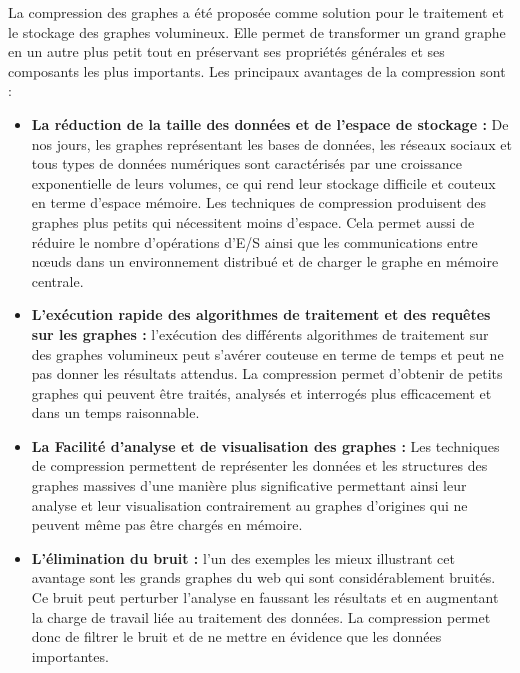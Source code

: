 La compression des graphes a été proposée comme solution pour le traitement et le stockage des graphes volumineux. Elle permet de transformer un grand graphe en un autre plus petit tout en préservant ses propriétés générales et ses composants les plus importants.
Les principaux avantages de la compression sont  \citep{liu2018graph} :
\begin{itemize}

\item \textbf{La réduction de la taille des données et de l'espace de stockage :} De nos jours, les graphes représentant les bases de données, les réseaux sociaux et tous types de données numériques sont caractérisés par une croissance exponentielle de leurs volumes, ce qui rend leur stockage difficile et couteux en terme d'espace mémoire. Les techniques de compression produisent des graphes plus petits qui nécessitent moins d'espace. Cela permet aussi de réduire le nombre d'opérations d'E/S ainsi que les communications entre nœuds dans un environnement distribué et de charger le graphe en mémoire centrale.   

\item \textbf{L'exécution rapide des algorithmes de traitement et des requêtes sur les graphes :} l'exécution des différents algorithmes de traitement sur des graphes volumineux peut s'avérer couteuse en terme de temps et peut ne pas donner les résultats attendus. La compression permet d'obtenir de petits graphes qui peuvent être traités, analysés et interrogés plus efficacement et dans un temps raisonnable. 
  
\item \textbf{La Facilité d'analyse et de visualisation des graphes :} Les techniques de compression permettent de représenter les données et les structures des graphes massives d'une manière plus significative permettant ainsi leur analyse et leur visualisation contrairement au graphes d'origines qui ne peuvent même pas être chargés en mémoire.  

\item \textbf{L'élimination du bruit :} l'un des exemples les mieux illustrant cet avantage sont les grands graphes du web qui sont considérablement bruités. Ce bruit peut perturber l'analyse en faussant les résultats et en augmentant la charge de travail liée au traitement des données. La compression permet donc de filtrer le bruit et de ne mettre en évidence que les données importantes.

\end{itemize}



